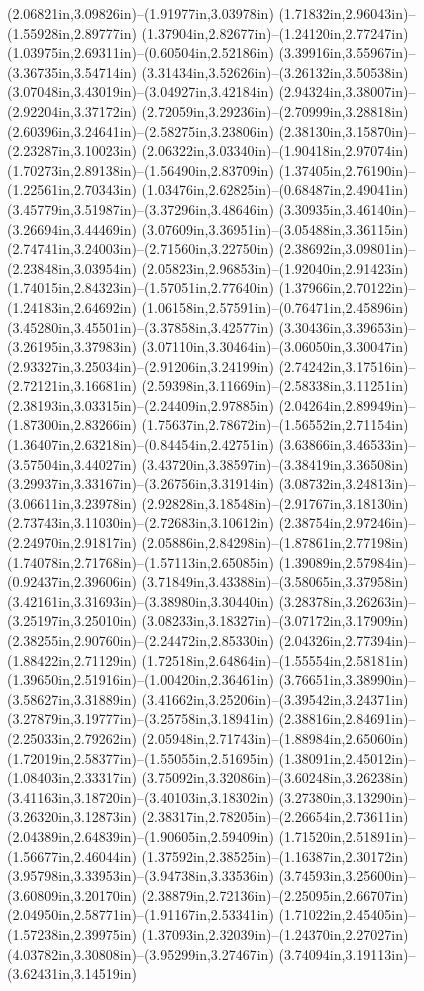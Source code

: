 (2.06821in,3.09826in)--(1.91977in,3.03978in) (1.71832in,2.96043in)--(1.55928in,2.89777in) (1.37904in,2.82677in)--(1.24120in,2.77247in) (1.03975in,2.69311in)--(0.60504in,2.52186in) (3.39916in,3.55967in)--(3.36735in,3.54714in) (3.31434in,3.52626in)--(3.26132in,3.50538in) (3.07048in,3.43019in)--(3.04927in,3.42184in) (2.94324in,3.38007in)--(2.92204in,3.37172in) (2.72059in,3.29236in)--(2.70999in,3.28818in) (2.60396in,3.24641in)--(2.58275in,3.23806in) (2.38130in,3.15870in)--(2.23287in,3.10023in) (2.06322in,3.03340in)--(1.90418in,2.97074in) (1.70273in,2.89138in)--(1.56490in,2.83709in) (1.37405in,2.76190in)--(1.22561in,2.70343in) (1.03476in,2.62825in)--(0.68487in,2.49041in) (3.45779in,3.51987in)--(3.37296in,3.48646in) (3.30935in,3.46140in)--(3.26694in,3.44469in) (3.07609in,3.36951in)--(3.05488in,3.36115in) (2.74741in,3.24003in)--(2.71560in,3.22750in) (2.38692in,3.09801in)--(2.23848in,3.03954in) (2.05823in,2.96853in)--(1.92040in,2.91423in) (1.74015in,2.84323in)--(1.57051in,2.77640in) (1.37966in,2.70122in)--(1.24183in,2.64692in) (1.06158in,2.57591in)--(0.76471in,2.45896in) (3.45280in,3.45501in)--(3.37858in,3.42577in) (3.30436in,3.39653in)--(3.26195in,3.37983in) (3.07110in,3.30464in)--(3.06050in,3.30047in) (2.93327in,3.25034in)--(2.91206in,3.24199in) (2.74242in,3.17516in)--(2.72121in,3.16681in) (2.59398in,3.11669in)--(2.58338in,3.11251in) (2.38193in,3.03315in)--(2.24409in,2.97885in) (2.04264in,2.89949in)--(1.87300in,2.83266in) (1.75637in,2.78672in)--(1.56552in,2.71154in) (1.36407in,2.63218in)--(0.84454in,2.42751in) (3.63866in,3.46533in)--(3.57504in,3.44027in) (3.43720in,3.38597in)--(3.38419in,3.36508in) (3.29937in,3.33167in)--(3.26756in,3.31914in) (3.08732in,3.24813in)--(3.06611in,3.23978in) (2.92828in,3.18548in)--(2.91767in,3.18130in) (2.73743in,3.11030in)--(2.72683in,3.10612in) (2.38754in,2.97246in)--(2.24970in,2.91817in) (2.05886in,2.84298in)--(1.87861in,2.77198in) (1.74078in,2.71768in)--(1.57113in,2.65085in) (1.39089in,2.57984in)--(0.92437in,2.39606in) (3.71849in,3.43388in)--(3.58065in,3.37958in) (3.42161in,3.31693in)--(3.38980in,3.30440in) (3.28378in,3.26263in)--(3.25197in,3.25010in) (3.08233in,3.18327in)--(3.07172in,3.17909in) (2.38255in,2.90760in)--(2.24472in,2.85330in) (2.04326in,2.77394in)--(1.88422in,2.71129in) (1.72518in,2.64864in)--(1.55554in,2.58181in) (1.39650in,2.51916in)--(1.00420in,2.36461in) (3.76651in,3.38990in)--(3.58627in,3.31889in) (3.41662in,3.25206in)--(3.39542in,3.24371in) (3.27879in,3.19777in)--(3.25758in,3.18941in) (2.38816in,2.84691in)--(2.25033in,2.79262in) (2.05948in,2.71743in)--(1.88984in,2.65060in) (1.72019in,2.58377in)--(1.55055in,2.51695in) (1.38091in,2.45012in)--(1.08403in,2.33317in) (3.75092in,3.32086in)--(3.60248in,3.26238in) (3.41163in,3.18720in)--(3.40103in,3.18302in) (3.27380in,3.13290in)--(3.26320in,3.12873in) (2.38317in,2.78205in)--(2.26654in,2.73611in) (2.04389in,2.64839in)--(1.90605in,2.59409in) (1.71520in,2.51891in)--(1.56677in,2.46044in) (1.37592in,2.38525in)--(1.16387in,2.30172in) (3.95798in,3.33953in)--(3.94738in,3.33536in) (3.74593in,3.25600in)--(3.60809in,3.20170in) (2.38879in,2.72136in)--(2.25095in,2.66707in) (2.04950in,2.58771in)--(1.91167in,2.53341in) (1.71022in,2.45405in)--(1.57238in,2.39975in) (1.37093in,2.32039in)--(1.24370in,2.27027in) (4.03782in,3.30808in)--(3.95299in,3.27467in) (3.74094in,3.19113in)--(3.62431in,3.14519in) 
